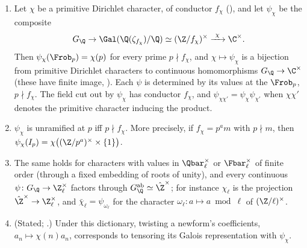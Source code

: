 \begin{theorem}\label{thm:ant:dirichletgalois}
\begin{enumerate}[label=(\roman*)]
\item Let $\chi$ be a primitive Dirichlet character, of conductor $f_\chi$ (), and let $\psi_\chi$ be the composite
\[
G_\Q\to\Gal(\Q(\zeta_{f_\chi})/\Q)\simeq(\Z/f_\chi)^\times\xrightarrow{\ \chi\ }\C^\times.
\] Then $\psi_\chi(\Frob_p)=\chi(p)$ for every prime $p\nmid f_\chi$, and
$\chi\mapsto\psi_\chi$ is a bijection from primitive Dirichlet characters to continuous homomorphisms $G_\Q\to\C^\times$ (these have finite image,
). Each $\psi$ is determined by its values at the $\Frob_p$, $p\nmid f_\chi$. The field cut out by $\psi_\chi$ has conductor $f_\chi$, and
$\psi_{\chi\chi'}=\psi_\chi\psi_{\chi'}$ when $\chi\chi'$ denotes the primitive character inducing the product.
\item $\psi_\chi$ is unramified at $p$ iff $p\nmid f_\chi$. More precisely, if $f_\chi=p^am$ with $p\nmid m$, then $\psi_\chi(I_p)=\chi\bigl((\Z/p^a)^\times\times\{1\}\bigr)$.
\item The same holds for characters with values in $\Qbar_\ell^\times$ or $\Fbar_\ell^\times$ of finite order (through a fixed embedding of roots of unity),
and every continuous $\psi\colon G_\Q\to\Z_\ell^\times$ factors through $G_\Q^{\mathrm{ab}}\simeq\hat\Z^\times$; for instance $\chi_\ell$ is the projection
$\hat\Z^\times\to\Z_\ell^\times$, and $\bar\chi_\ell=\psi_{\omega_\ell}$ for the character $\omega_\ell\colon a\mapsto a\bmod\ell$ of $(\Z/\ell)^\times$.
\item (Stated; .) Under this dictionary, twisting a newform's coefficients, $a_n\mapsto\chi(n)a_n$, corresponds to tensoring its
Galois representation with $\psi_\chi$.
\end{enumerate}
\end{theorem}

